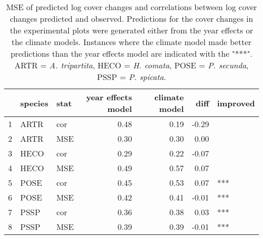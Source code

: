 \begin{table}[!h]
\centering
\caption{MSE of predicted log cover changes and correlations between log cover changes predicted and observed. Predictions for the cover changes in the experimental plots were generated either from the year effects or the climate models. Instances where the climate model made better predictions than the year effects model are indicated with the "***". ARTR = \textit{A. tripartita}, HECO = \textit{H. comata}, POSE = \textit{P. secunda}, PSSP = \textit{P. spicata}.} 
\label{table:corPGR}
\begin{tabular}{rllrrrl}
  \hline
 & species & stat & year effects model & climate model & diff & improved \\ 
  \hline
1 & ARTR & cor & 0.48 & 0.19 & -0.29 &  \\ 
  2 & ARTR & MSE & 0.30 & 0.30 & 0.00 &  \\ 
  3 & HECO & cor & 0.29 & 0.22 & -0.07 &  \\ 
  4 & HECO & MSE & 0.49 & 0.57 & 0.07 &  \\ 
  5 & POSE & cor & 0.45 & 0.53 & 0.07 & *** \\ 
  6 & POSE & MSE & 0.42 & 0.41 & -0.01 & *** \\ 
  7 & PSSP & cor & 0.36 & 0.38 & 0.03 & *** \\ 
  8 & PSSP & MSE & 0.39 & 0.39 & -0.01 & *** \\ 
   \hline
\end{tabular}
\end{table}
